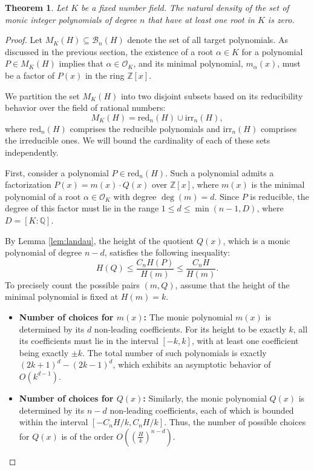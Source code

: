 \documentclass[10pt,a4paper]{amsart}
\newtheorem{theorem}{Theorem}
\newcommand{\OK}{\mathcal{O}_K}
\newcommand{\Q}{\mathbb{Q}}
\newcommand{\Z}{\mathbb{Z}}
\begin{document}
\begin{theorem}\label{thm:main}
Let $K$ be a fixed number field. The natural density of the set of monic integer polynomials of degree $n$ that have at least one root in $K$ is zero.
\end{theorem}

\begin{proof}
Let $M_K(H) \subseteq \mathcal{B}_n(H)$ denote the set of all target polynomials. As discussed in the previous section, the existence of a root $\alpha \in K$ for a polynomial $P \in M_K(H)$ implies that $\alpha \in \OK$, and its minimal polynomial, $m_\alpha(x)$, must be a factor of $P(x)$ in the ring $\Z[x]$.

We partition the set $M_K(H)$ into two disjoint subsets based on its reducibility behavior over the field of rational numbers:
\begin{equation*}
    M_K(H) = \mathrm{red}_n(H) \cup \mathrm{irr}_n(H),
\end{equation*}
where $\mathrm{red}_n(H)$ comprises the reducible polynomials and $\mathrm{irr}_n(H)$ comprises the irreducible ones. We will bound the cardinality of each of these sets independently.

First, consider a polynomial $P \in \mathrm{red}_n(H)$. Such a polynomial admits a factorization $P(x) = m(x) \cdot Q(x)$ over $\Z[x]$, where $m(x)$ is the minimal polynomial of a root $\alpha \in \OK$ with degree $\deg(m) = d$. Since $P$ is reducible, the degree of this factor must lie in the range $1 \le d \le \min(n-1, D)$, where $D =[K:\Q]$. 

By Lemma \ref{lem:landau}, the height of the quotient $Q(x)$, which is a monic polynomial of degree $n-d$, satisfies the following inequality:
\begin{equation*}
    H(Q) \le \frac{C_n H(P)}{H(m)} \le \frac{C_n H}{H(m)}.
\end{equation*}
To precisely count the possible pairs $(m, Q)$, assume that the height of the minimal polynomial is fixed at $H(m) = k$.
\begin{itemize}
    \item \textbf{Number of choices for $m(x)$:} The monic polynomial $m(x)$ is determined by its $d$ non-leading coefficients. For its height to be exactly $k$, all its coefficients must lie in the interval $[-k, k]$, with at least one coefficient being exactly $\pm k$. The total number of such polynomials is exactly $(2k+1)^d - (2k-1)^d$, which exhibits an asymptotic behavior of $O(k^{d-1})$.
    \item \textbf{Number of choices for $Q(x)$:} Similarly, the monic polynomial $Q(x)$ is determined by its $n-d$ non-leading coefficients, each of which is bounded within the interval $[-C_n H/k, C_n H/k]$. Thus, the number of possible choices for $Q(x)$ is of the order $O\left( \left(\frac{H}{k}\right)^{n-d} \right)$.
\end{itemize}


\end{proof}
\end{document}

